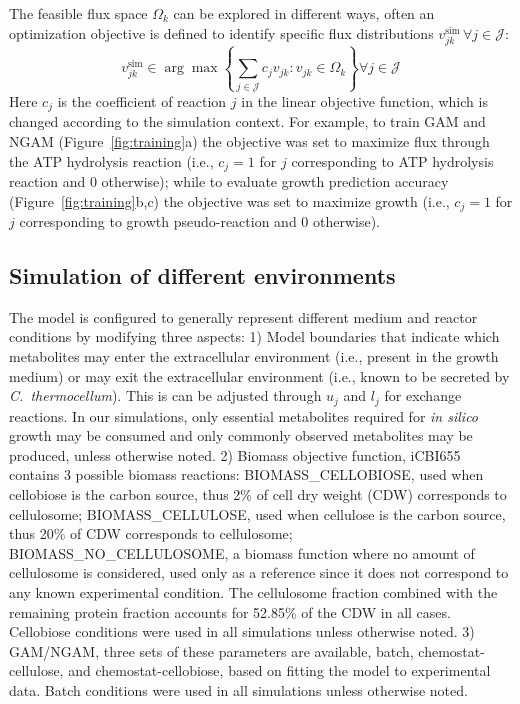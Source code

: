 The feasible flux space $\Omega_k$ can be explored in different ways,\citep{trinh2009,palsson2015} often an optimization objective is defined to identify specific flux distributions $v_{jk}^{\text{sim}}\, \forall j \in \mathcal{J}$:
\begin{equation}
    v_{jk}^{\text{sim}} \in \arg \max \left\{ \sum_{j \in \mathcal{J}} c_j v_{jk}: v_{jk} \in \Omega_k \right\}  \forall j \in \mathcal{J} \label{eq:fba}
\end{equation}
Here $c_j$ is the coefficient of reaction $j$ in the linear objective function, which is changed according to the simulation context. For example, to train GAM and NGAM (Figure~\ref{fig:training}a) the objective was set to maximize flux through the ATP hydrolysis reaction (i.e., $c_j=1$ for $j$ corresponding to ATP hydrolysis reaction and 0 otherwise); while to evaluate growth prediction accuracy (Figure~\ref{fig:training}b,c) the objective was set to maximize growth (i.e., $c_j=1$ for $j$ corresponding to growth pseudo-reaction and 0 otherwise).


\subsection{Simulation of different environments}
The model is configured to generally represent different medium and reactor conditions by modifying three aspects:
1) Model boundaries that indicate which metabolites may enter the extracellular environment (i.e., present in the growth medium) or may exit the extracellular environment (i.e., known to be secreted by \textit{C.~thermocellum}). This is can be adjusted through $u_j$ and $l_j$ for exchange reactions.
In our simulations, only essential metabolites required for \textit{in silico} growth may be consumed and only commonly observed metabolites may be
produced, unless otherwise noted.
2) Biomass objective function, iCBI655 contains 3 possible biomass reactions:
BIOMASS\_CELLOBIOSE, used when cellobiose is the carbon source, thus 2\% of cell dry weight (CDW) corresponds to cellulosome;\citep{zhang2005}
BIOMASS\_CELLULOSE, used when cellulose is the carbon source, thus 20\% of CDW corresponds to cellulosome; \citep{zhang2005}
BIOMASS\_NO\_CELLULOSOME, a biomass function where no amount of cellulosome is considered, used only as a reference since it does not correspond to any known experimental condition.
The cellulosome fraction combined with the remaining protein fraction accounts for 52.85\% of the CDW in all cases. \citep{roberts2010, thompson2015}
Cellobiose conditions were used in all simulations unless otherwise noted.
3) GAM/NGAM, three sets of these parameters are available, batch, chemostat-cellulose, and chemostat-cellobiose, based on fitting the model to experimental data.
Batch conditions were used in all simulations unless otherwise noted.

